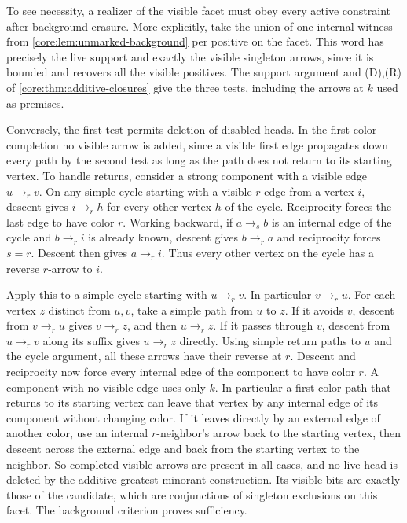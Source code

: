 To see necessity, a realizer of the visible facet must
obey every active constraint after background erasure.
More explicitly, take the union of one internal witness
from \cref{core:lem:unmarked-background} per positive on the
facet. This word has precisely the live support and exactly
the visible singleton arrows, since it is bounded and
recovers all the visible positives. The support argument
and (D),(R) of \cref{core:thm:additive-closures}
give the three tests, including the arrows at $k$ used
as premises.

Conversely, the first test permits deletion of disabled
heads. In the first-color completion no visible arrow is
added, since a visible first edge propagates down every
path by the second test as long as the path does not
return to its starting vertex. To handle returns,
consider a strong component with a visible edge
$u\to_r v$. On any simple cycle starting with a visible
$r$-edge from a vertex $i$, descent gives $i\to_r h$
for every other vertex $h$ of the cycle. Reciprocity
forces the last edge to have color $r$. Working
backward, if $a\to_s b$ is an internal edge of the
cycle and $b\to_r i$ is already known, descent gives
$b\to_r a$ and reciprocity forces $s=r$. Descent then
gives $a\to_r i$. Thus every other vertex on the cycle
has a reverse $r$-arrow to $i$.

Apply this to a simple cycle starting with $u\to_r v$.
In particular $v\to_r u$. For each vertex $z$ distinct
from $u,v$, take a simple path from $u$ to $z$. If
it avoids $v$, descent from $v\to_r u$ gives
$v\to_r z$, and then $u\to_r z$. If it passes through
$v$, descent from $u\to_r v$ along its suffix gives
$u\to_r z$ directly. Using simple return paths to $u$
and the cycle argument, all these arrows have their
reverse at $r$. Descent and reciprocity now force
every internal edge of the component to have color $r$.
A component with no visible edge uses only $k$.
In particular a first-color path that returns to its
starting vertex can leave that vertex by any internal
edge of its component without changing color. If it
leaves directly by an external edge of another color,
use an internal $r$-neighbor's arrow back to the
starting vertex, then descent across the external edge
and back from the starting vertex to the neighbor.
So completed visible arrows are present in all cases,
and no live head
is deleted by the additive greatest-minorant construction.
Its visible bits are exactly those of the candidate,
which are conjunctions of singleton exclusions on this
facet. The background criterion proves sufficiency.

